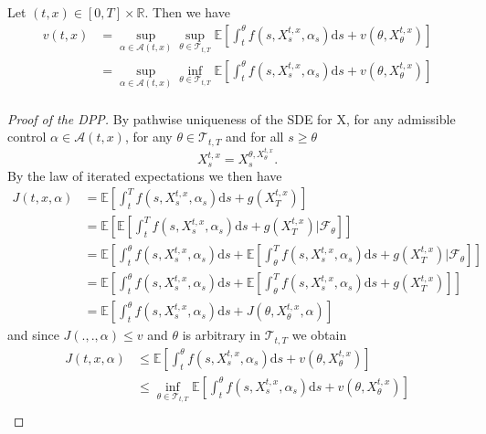 \begin{theorem}
    Let $(t,x)\in[0,T]\times\mathbb{R}.$ Then we have
    \begin{align}
        v(t,x)&=\sup_{\alpha\in\mathcal{A}(t,x)}\sup_{\theta\in\mathcal{T}_{t,T}}\mathbb{E}\left[\int_{t}^\theta f(s,X_s^{t,x},\alpha_s)\mathrm ds+v(\theta,X_\theta^{t,x})\right]\\
        &=\sup_{\alpha\in\mathcal{A}(t,x)}\inf_{\theta\in\mathcal{T}_{t,T}}\mathbb{E}\left[\int_{t}^\theta f(s,X_s^{t,x},\alpha_s)\mathrm ds+v(\theta,X_\theta^{t,x})\right]\\
    \end{align}
\end{theorem}
\begin{proof}[Proof of the DPP]
    By pathwise uniqueness of the SDE for X, for any admissible control $\alpha\in\mathcal{A}(t,x)$,
    for any $\theta\in\mathcal{T}_{t,T}$ and for all $s\geq\theta$
    \begin{equation}
        X_s^{t,x}=X_s^{\theta,X_\theta^{t,x}}.
    \end{equation}
    By the law of iterated expectations we then have
    \begin{align*}
        J(t,x,\alpha)&=\mathbb{E}\left[\int_t^Tf(s,X_s^{t,x},\alpha_s)\mathrm ds+g(X_T^{t,x})\right]\\
        &=\mathbb{E}\left[\mathbb{E}\left[\int_t^Tf(s,X_s^{t,x},\alpha_s)\mathrm ds+g(X_T^{t,x})|\mathcal{F}_\theta\right]\right]\\
        &=\mathbb{E}\left[\int_t^\theta f(s,X_s^{t,x},\alpha_s)\mathrm ds+\mathbb{E}\left[\int_\theta^Tf(s,X_s^{t,x},\alpha_s)\mathrm ds+g(X_T^{t,x})|\mathcal{F}_\theta\right]\right]\\
        &=\mathbb{E}\left[\int_t^\theta f(s,X_s^{t,x},\alpha_s)\mathrm ds+\mathbb{E}\left[\int_\theta^Tf(s,X_s^{t,x},\alpha_s)\mathrm ds+g(X_T^{t,x})\right]\right]\\
        &=\mathbb{E}\left[\int_t^\theta f(s,X_s^{t,x},\alpha_s)\mathrm ds+J(\theta,X_\theta^{t,x},\alpha)\right]
    \end{align*}
    and since $J(.,.,\alpha)\leq v$ and $\theta$ is arbitrary in $\mathcal{T}_{t,T}$
    we obtain
    \begin{align*}
        J(t,x,\alpha)&\leq\mathbb{E}\left[\int_t^\theta f(s,X_s^{t,x},\alpha_s)\mathrm ds+v(\theta,X_\theta^{t,x})\right]\\
        &\leq\inf_{\theta\in\mathcal{T}_{t,T}}\mathbb{E}\left[\int_t^\theta f(s,X_s^{t,x},\alpha_s)\mathrm ds+v(\theta,X_\theta^{t,x})\right]\\

\end{align*}
\end{proof}
